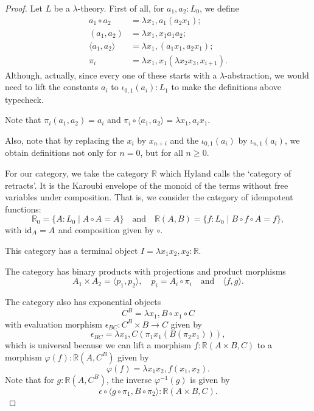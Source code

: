 \begin{proof}
  Let $ L $ be a $ \lambda $-theory. First of all, for $ a_1, a_2: L_0 $, we define
  \begin{align*}
    a_1 \circ a_2 &= \lambda x_1, a_1 (a_2 x_1);\\
    (a_1, a_2) &= \lambda x_1, x_1 a_1 a_2;\\
    \langle a_1, a_2 \rangle &= \lambda x_1, (a_1 x_1, a_2 x_1);\\
    \pi_i &= \lambda x_1, x_1 (\lambda x_2 x_3, x_{i + 1}).
  \end{align*}
  Although, actually, since every one of these starts with a $ \lambda $-abstraction, we would need to lift the constants $ a_i $ to $ \iota_{0, 1}(a_i): L_1 $ to make the definitions above typecheck.

  Note that $ \pi_i (a_1, a_2) = a_i $ and $ \pi_i \circ \langle a_1, a_2 \rangle = \lambda x_1, a_i x_1 $.

  Also, note that by replacing the $ x_i $ by $ x_{n + i} $ and the $ \iota_{0, 1}(a_i) $ by $ \iota_{n, 1}(a_i) $, we obtain definitions not only for $ n = 0 $, but for all $ n \geq 0 $.

  For our category, we take the category $ \mathbb R $ which Hyland calls the `category of retracts'. It is the Karoubi envelope of the monoid of the terms without free variables under composition. That is, we consider the category of idempotent functions:
  \[ \mathbb R_0 = \{ A : L_0 \mid A \circ A = A \} \quad \text{and} \quad \mathbb R(A, B) = \{ f: L_0 \mid B \circ f \circ A = f \}, \]
  with $ \text{id}_{A} = A $ and composition given by $ \circ $.

  This category has a terminal object $ I = \lambda x_1 x_2, x_2 : \mathbb R $.

  The category has binary products with projections and product morphisms
  \[ A_1 \times A_2 = \langle p_1, p_2 \rangle, \quad p_i = A_i \circ \pi_i \quad \text{and} \quad \langle f, g \rangle. \]

  The category also has exponential objects
  \[ C^B = \lambda x_1, B \circ x_1 \circ C \]
  with evaluation morphism $ \epsilon_{BC}: C^B \times B \to C $ given by
  \[ \epsilon_{BC} = \lambda x_1, C(\pi_1 x_1 (B (\pi_2 x_1))), \]
  which is universal because we can lift a morphism $ f: \mathbb R(A \times B, C) $ to a morphism $ \varphi(f): \mathbb R(A, C^B) $ given by
  \[ \varphi(f) = \lambda x_1 x_2, f (x_1, x_2). \]
  Note that for $ g: \mathbb R(A, C^B) $, the inverse $ \varphi^{-1}(g) $ is given by
  \[ \epsilon \circ \langle g \circ \pi_1, B \circ \pi_2 \rangle: \mathbb R(A \times B, C). \]


\end{proof}
